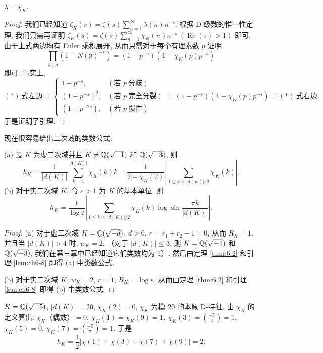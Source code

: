 \begin{lemma}\label{lem:ch6-8}
$\lambda=\chi_K$.
\end{lemma}

\begin{proof}
我们已经知道 $\zeta_K(s)=\zeta(s)\sum_{n=1}^{\infty}\lambda(n)n^{-s}$. 根据 D-级数的惟一性定理, 我们只需再证明 $\zeta_K(s)=\zeta(s)\sum_{n=1}^{\infty}\chi_K(n)n^{-s}\ (\operatorname{Re}(s)>1)$ 即可. 由于上式两边均有 Euler 乘积展开, 从而只需对于每个有理素数 $p$ 证明
\begin{equation}\tag{*}
  \prod_{\mathfrak{p}\mid p}(1-N(\mathfrak{p})^{-s})=(1-p^{-s})(1-\chi_K(p)p^{-s})
\end{equation}
即可. 事实上,
\[
  (*)\ \text{式左边}=\begin{cases}
    1-p^{-s}, & (\text{若 } p\ \text{分歧})\\
    (1-p^{-s})^2, & (\text{若 } p\ \text{完全分裂})\\
    (1-p^{-2s}), & (\text{若 } p\ \text{惯性})
  \end{cases}
  =(1-p^{-s})(1-\chi_K(p)p^{-s})=(*)\ \text{式右边}.
\]
于是证明了引理.
\end{proof}

现在很容易给出二次域的类数公式:

\begin{theorem}\label{thm:6.3}
(a) 设 $K$ 为虚二次域并且 $K\neq\mathbb{Q}(\sqrt{-1})$ 和 $\mathbb{Q}(\sqrt{-3})$, 则
\[
  h_K=\frac{1}{|d(K)|}\sum_{k=1}^{|d(K)|}\chi_K(k)k
  =\frac{1}{2-\chi_K(2)}\left|\sum_{1\leqslant k<|d(K)|/2}\chi_K(k)\right|.
\]
(b) 对于实二次域 $K$, 令 $\varepsilon>1$ 为 $K$ 的基本单位, 则
\[
  h_K=\frac{1}{\log\varepsilon}\left|\sum_{1\leqslant k<|d(K)|/2}\chi_K(k)\log\sin\frac{\pi k}{|d(K)|}\right|.
\]
\end{theorem}

\begin{proof}
(a) 对于虚二次域 $K=\mathbb{Q}(\sqrt{-d})$, $d>0$, $r=r_1+r_2-1=0$, 从而 $R_K=1$. 并且当 $|d(K)|>4$ 时, $w_K=2$. （对于 $|d(K)|\leqslant 3$, 则 $K=\mathbb{Q}(\sqrt{-1})$ 和 $\mathbb{Q}(\sqrt{-3})$, 我们在第三章中已经知道它们类数均为 $1$）. 然后由定理 \ref{thm:6.2} 和引理 \ref{lem:ch6-8} 即得 (a) 中类数公式.

(b) 对于实二次域 $K$, $w_K=2$, $r=1$, $R_K=\log\varepsilon$, 从而由定理 \ref{thm:6.2} 和引理 \ref{lem:ch6-8} 即得 (b) 中类数公式.
\end{proof}

\setcounter{example}{0}%

\begin{example}
$K=\mathbb{Q}(\sqrt{-5})$, $|d(K)|=20$, $\chi_K(2)=0$, $\chi_K$ 为模 $20$ 的本原 D-特征. 由 $\chi_K$ 的定义算出: $\chi_K$（偶数）$=0$, $\chi_K(1)=\chi_K(9)=1$, $\chi_K(3)=\left(\frac{-5}{3}\right)=1$, $\chi_K(5)=0$, $\chi_K(7)=\left(\frac{-5}{7}\right)=1$. 于是
\[
  h_K=\frac{1}{2}\left|\chi(1)+\chi(3)+\chi(7)+\chi(9)\right|=2.
\]
\end{example}

